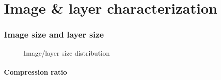 \section{Image \& layer characterization}
\label{sec:redundant_layers}

\subsubsection{Image size and layer size}

\begin{figure}[!t]
	\centering
	\caption{Image/layer size distribution}
	\label{fig:image-size}
\end{figure}

\paragraph{Compression ratio}

